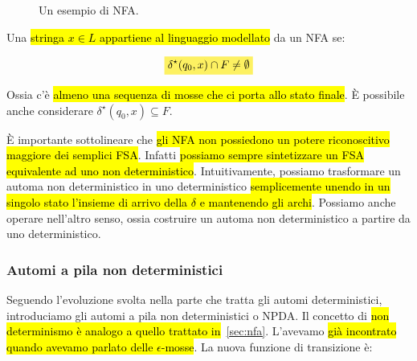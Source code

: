 \documentclass[a4paper,11pt,oneside]{article}
\theoremstyle{plain}
\theoremstyle{definition}
\theoremstyle{remark}
\newcommand{\mhl}[1]{\colorbox{hlcolor}{$\displaystyle #1$}}
\begin{document}
\begin{figure}[htb]
  \centering
  \caption{Un esempio di NFA.}\label{fig:nfa}
\end{figure}

Una \hl{stringa $x \in L$ appartiene al linguaggio modellato} da un NFA se:

\begin{equation}
  \mhl{ \delta^\star(q_0, x) \cap F \neq \emptyset }
\end{equation}

Ossia c'è \hl{almeno una sequenza di mosse che ci porta allo stato finale}. È
possibile anche considerare $\delta^\star(q_0, x) \subseteq F$.

È importante sottolineare che \hl{gli NFA non possiedono un potere riconoscitivo
maggiore dei semplici FSA}\@. Infatti \hl{possiamo sempre sintetizzare un FSA
equivalente ad uno non deterministico}. Intuitivamente, possiamo trasformare un
automa non deterministico in uno deterministico \hl{semplicemente unendo in un
singolo stato l'insieme di arrivo della $\delta$ e mantenendo gli archi}.
Possiamo anche operare nell'altro senso, ossia costruire un automa non
deterministico a partire da uno deterministico.

\subsubsection{Automi a pila non deterministici}\label{sec:npda}

Seguendo l'evoluzione svolta nella parte che tratta gli automi deterministici,
introduciamo gli automi a pila non deterministici o NPDA\@. Il concetto di \hl{non
determinismo è analogo a quello trattato in}~\ref{sec:nfa}. L'avevamo \hl{già
incontrato quando avevamo parlato delle $\epsilon$-mosse}. La nuova funzione di
transizione è:
\end{document}
